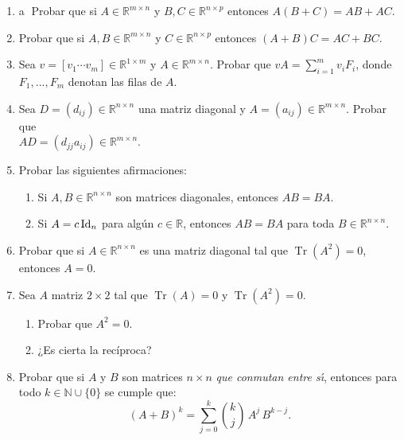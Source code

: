 \begin{enumerate}[resume, topsep=6pt, itemsep=.4cm]


\item\label{ej: distributiva} \textcircled{a} Probar que si $A\in\mathbb{R}^{m\times n}$ y $B,C\in\mathbb{R}^{n\times p}$ entonces
$A(B+ C)=AB + AC$.

\item Probar que si $A,B\in\mathbb{R}^{m\times n}$ y $C\in\mathbb{R}^{n\times p}$ entonces
$(A+B)C = AC + BC$.

\item Sea $v=[v_1 \cdots v_m]\in\mathbb{R}^{1\times m}$ y $A\in\mathbb{R}^{m\times n}$. Probar que $vA=\sum_{i=1}^m v_iF_i$, donde $F_1, ..., F_m$ denotan las filas de $A$.

\item Sea $D=(d_{ij})\in\mathbb{R}^{n\times n}$ una matriz diagonal y $A=(a_{ij})\in\mathbb{R}^{m\times n}$. Probar que \\ $AD=(d_{jj}a_{ij})\in\mathbb{R}^{m\times n}$.

\item
Probar las siguientes afirmaciones:
\begin{enumerate}[topsep=5pt,itemsep=5pt]
\item Si $A,B\in\mathbb{R}^{n\times n}$ son matrices diagonales, entonces $AB=BA$.
\item Si $A=c \operatorname{Id}_n$ para algún $c \in \mathbb{R}$, entonces $AB=BA$ para toda $B\in\mathbb{R}^{n\times n}$.
\end{enumerate}

\item Probar que si $A\in\mathbb{R}^{n\times n}$ es una matriz diagonal tal que $\operatorname{Tr} (A^2)=0$, entonces $A=0$.

\item Sea $A$ matriz $2\times 2$  tal que $\operatorname{Tr}(A)=0$ y $\operatorname{Tr}(A^2)=0$.

\begin{enumerate}[topsep=5pt,itemsep=5pt]
    \item  Probar que $A^2 = 0$.
    \item  ¿Es cierta la recíproca?
\end{enumerate}


\item Probar que si $A$ y $B$ son matrices $n \times n$ \emph{que conmutan entre s\' \i}, entonces para todo $k \in \mathbb N \cup \{0\}$ se cumple que:
$$(A+B)^k = \sum_{j = 0}^k \binom{k}{j} \, A^j \, B^{k-j}.$$


\end{enumerate}
